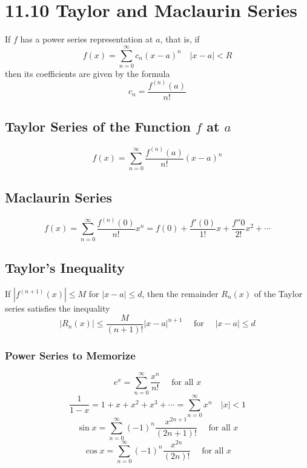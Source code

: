 %
%

\section*{11.10 Taylor and Maclaurin Series}

If \(f\) has a power series representation at \(a\), that is, if
\[ f(x) = \sum_{n=0}^{\infty}{c_n(x-a)^n} \quad |x-a|<R\]
then its coefficients are given by the formula
\[c_n = \frac{f^{(n)}(a)}{n!}\]

\subsection*{Taylor Series of the Function \(f\) at \(a\)}

\[ f(x) = \sum_{n=0}^{\infty}{\frac{f^{(n)}(a)}{n!}(x-a)^n}\]

\subsection*{Maclaurin Series}

\[f(x) = \sum_{n=0}^{\infty}{\frac{f^{(n)}(0)}{n!}x^n} = f(0)
+ \frac{f'(0)}{1!}x + \frac{f''{0}}{2!}x^2 + \cdots\]

\subsection*{Taylor's Inequality}

If \(|f^{(n+1)}{(x)}| \leq M\) for \(|x-a| \leq d\), then the remainder
\(R_n(x)\) of the Taylor series satisfies the inequality
\[ |R_n(x)| \leq \frac{M}{(n+1)!}|x-a|^{n+1} \quad \text{ for } \quad |x-a| \leq
d\]

\subsubsection*{Power Series to Memorize}

\[e^x = \sum_{n=0}^{\infty}{\frac{x^n}{n!}} \quad \text{ for all } x\]
\[ \frac{1}{1-x} = 1 + x + x^2 + x^3 + \cdots = \sum_{n=0}^{\infty}{x^n} \quad
|x| < 1\]
\[ \sin{x} = \sum_{n=0}^{\infty}{(-1)^n \frac{x^{2n+1}}{(2n+1)!}} \quad
\text{ for all } x\] 
\[ \cos{x} = \sum_{n=0}^{\infty}{(-1)^n \frac{x^{2n}}{(2n)!}} \quad
\text{ for all } x\] 
